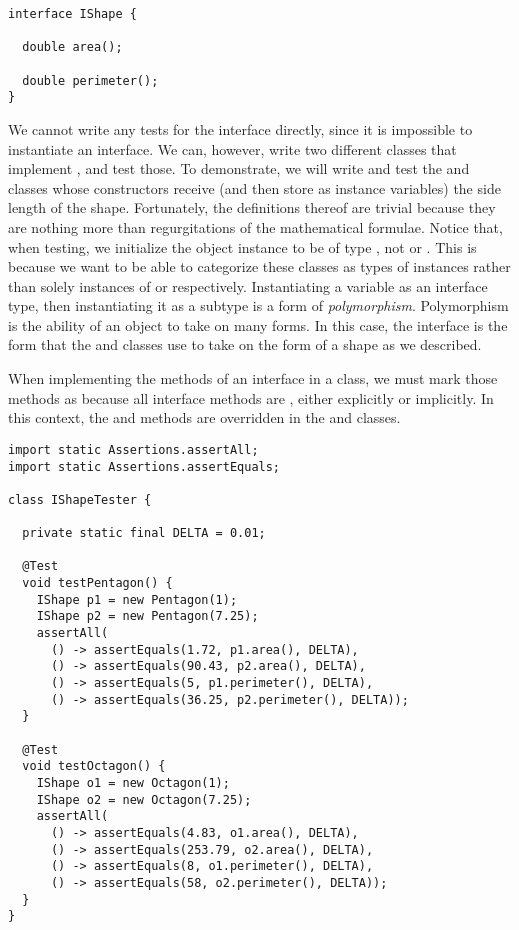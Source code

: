 \begin{lstlisting}[language=MyJava]
interface IShape {

  double area();

  double perimeter();
}
\end{lstlisting}

We cannot write any tests for the  interface directly, since it is impossible to instantiate an interface. We can, however, write two different classes that implement , and test those. To demonstrate, we will write and test the  and  classes whose constructors receive (and then store as instance variables) the side length of the shape. Fortunately, the definitions thereof are trivial because they are nothing more than regurgitations of the mathematical formulae. Notice that, when testing, we initialize the object instance to be of type , not  or . This is because we want to be able to categorize these classes as types of  instances rather than solely instances of  or  respectively. Instantiating a variable as an interface type, then instantiating it as a subtype is a form of \emph{polymorphism}. Polymorphism is the ability of an object to take on many forms. In this case, the  interface is the form that the  and  classes use to take on the form of a shape as we described. 

When implementing the methods of an interface in a class, we must mark those methods as  because all interface methods are , either explicitly or implicitly. In this context, the  and  methods are overridden in the  and  classes.

\begin{lstlisting}[language=MyJava]
import static Assertions.assertAll;
import static Assertions.assertEquals;

class IShapeTester {

  private static final DELTA = 0.01;
  
  @Test
  void testPentagon() {
    IShape p1 = new Pentagon(1);
    IShape p2 = new Pentagon(7.25);
    assertAll(
      () -> assertEquals(1.72, p1.area(), DELTA),
      () -> assertEquals(90.43, p2.area(), DELTA),
      () -> assertEquals(5, p1.perimeter(), DELTA),
      () -> assertEquals(36.25, p2.perimeter(), DELTA));
  }

  @Test
  void testOctagon() {
    IShape o1 = new Octagon(1);
    IShape o2 = new Octagon(7.25);
    assertAll(
      () -> assertEquals(4.83, o1.area(), DELTA),
      () -> assertEquals(253.79, o2.area(), DELTA),
      () -> assertEquals(8, o1.perimeter(), DELTA),
      () -> assertEquals(58, o2.perimeter(), DELTA));
  }
}
\end{lstlisting}

